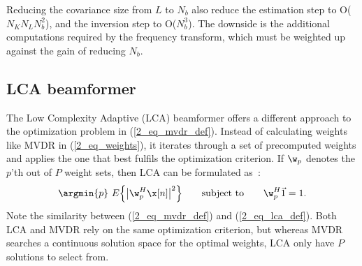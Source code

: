 {Reducing the covariance size from $L$ to $N_b$ also reduce the estimation step to O($N_K N_L N_b^2$), and the inversion step to O($N_b^3$). The downside is the additional computations required by the frequency transform, which must be weighted up against the gain of reducing $N_b$.



\subsection{LCA beamformer}

The Low Complexity Adaptive (LCA) beamformer offers a different approach to the optimization problem in (\ref{2_eq_mvdr_def}). Instead of calculating weights like MVDR in (\ref{2_eq_weights}), it iterates through a set of precomputed weights and applies the one that best fulfils the optimization criterion. If $\w_p$ denotes the $p$'th out of $P$ weight sets, then LCA can be formulated as~\cite{Synnevag2008}:
%
\begin{gather}
\argmin{p}\ E\Big\{\big|\w_p^H\x[n]\big|^2\Big\} \qquad\text{subject to}\qquad \w_p^H\1 = 1. \label{2_eq_lca_def}
\end{gather}
%
Note the similarity between (\ref{2_eq_mvdr_def}) and (\ref{2_eq_lca_def}). Both LCA and MVDR rely on the same optimization criterion, but whereas MVDR searches a continuous solution space for the optimal weights, LCA only have $P$ solutions to select from.






}
